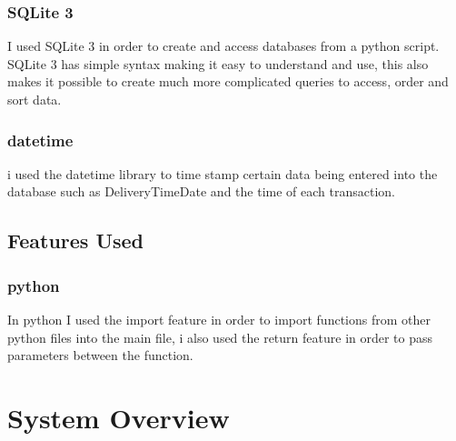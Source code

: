 \subsubsection{SQLite 3}
I used SQLite 3 in order to create and access databases from a python script. SQLite 3 has simple syntax making it easy to understand and use, this also makes it possible to create much more complicated queries to access, order and sort data.

\subsubsection{datetime}
i used the datetime library to time stamp certain data being entered into the database such as DeliveryTimeDate and the time of each transaction.

\subsection{Features Used}

\subsubsection{python}
In python I used the import feature in order to import functions from other python files into the main file, i also used the return feature in order to pass parameters between the function.

\subsubsection{}


\subsubsection{}


\subsubsection{}


\subsubsection{}


\section{System Overview}

